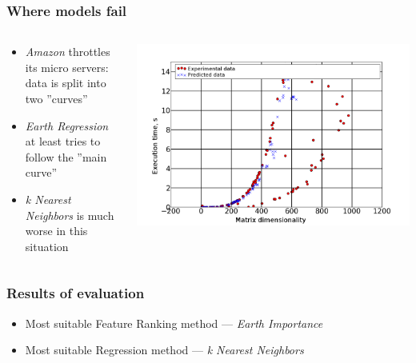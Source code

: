 \documentclass{beamer}
\begin{document}
\begin{frame}
\frametitle{Where models fail}
	\begin{columns}
		\begin{column}{0.4\textwidth}
			\begin{itemize}
				\item \textit{Amazon} throttles its micro servers: data is split into two ''curves''
				\item \textit{Earth Regression} at least tries to follow the ''main curve''
				\item \textit{k Nearest Neighbors} is much worse in this situation
			\end{itemize}
		\end{column}
		\begin{column}{0.6\textwidth}
			\includegraphics[scale=0.175]{failure-zeon}
		\end{column}
	\end{columns}
\end{frame}

\begin{frame}
\frametitle{Results of evaluation}
	\begin{itemize}
		\item Most suitable Feature Ranking method --- \textit{Earth Importance}
		\item Most suitable Regression method --- \textit{k Nearest Neighbors}
	\end{itemize}
\end{frame}
\end{document}
